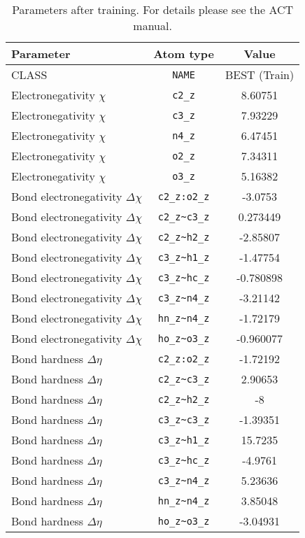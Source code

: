 \begin{table}[ht]
\caption{Parameters after training. For details please see the ACT manual.}
\begin{tabular}{lcc}
\hline
Parameter & Atom type & Value \\ 
\hline
CLASS & \verb^NAME^ & BEST (Train) \\ 
Electronegativity $\chi$ & \verb^c2_z^ & 8.60751 \\ 
Electronegativity $\chi$ & \verb^c3_z^ & 7.93229 \\ 
Electronegativity $\chi$ & \verb^n4_z^ & 6.47451 \\ 
Electronegativity $\chi$ & \verb^o2_z^ & 7.34311 \\ 
Electronegativity $\chi$ & \verb^o3_z^ & 5.16382 \\ 
Bond electronegativity $\Delta\chi$ & \verb^c2_z:o2_z^ & -3.0753 \\ 
Bond electronegativity $\Delta\chi$ & \verb^c2_z~c3_z^ & 0.273449 \\ 
Bond electronegativity $\Delta\chi$ & \verb^c2_z~h2_z^ & -2.85807 \\ 
Bond electronegativity $\Delta\chi$ & \verb^c3_z~h1_z^ & -1.47754 \\ 
Bond electronegativity $\Delta\chi$ & \verb^c3_z~hc_z^ & -0.780898 \\ 
Bond electronegativity $\Delta\chi$ & \verb^c3_z~n4_z^ & -3.21142 \\ 
Bond electronegativity $\Delta\chi$ & \verb^hn_z~n4_z^ & -1.72179 \\ 
Bond electronegativity $\Delta\chi$ & \verb^ho_z~o3_z^ & -0.960077 \\ 
Bond hardness $\Delta\eta$ & \verb^c2_z:o2_z^ & -1.72192 \\ 
Bond hardness $\Delta\eta$ & \verb^c2_z~c3_z^ & 2.90653 \\ 
Bond hardness $\Delta\eta$ & \verb^c2_z~h2_z^ & -8 \\ 
Bond hardness $\Delta\eta$ & \verb^c3_z~c3_z^ & -1.39351 \\ 
Bond hardness $\Delta\eta$ & \verb^c3_z~h1_z^ & 15.7235 \\ 
Bond hardness $\Delta\eta$ & \verb^c3_z~hc_z^ & -4.9761 \\ 
Bond hardness $\Delta\eta$ & \verb^c3_z~n4_z^ & 5.23636 \\ 
Bond hardness $\Delta\eta$ & \verb^hn_z~n4_z^ & 3.85048 \\ 
Bond hardness $\Delta\eta$ & \verb^ho_z~o3_z^ & -3.04931 \\ 

\end{tabular}
\end{table}
